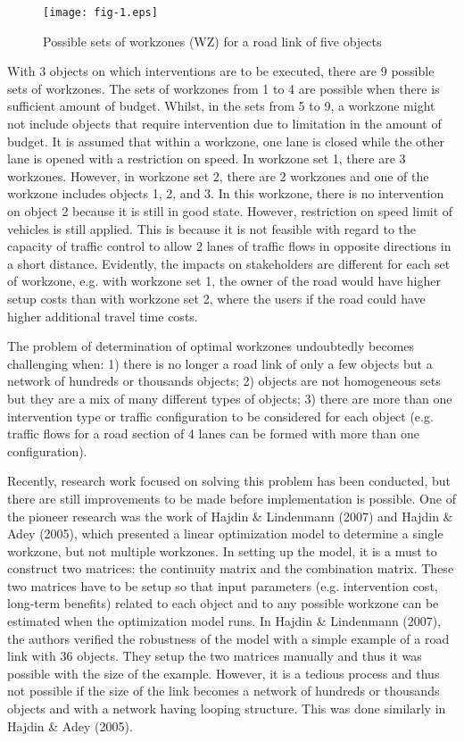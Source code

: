 \documentclass[10pt]{article}
\begin{document}
\begin{figure}[h]
\begin{center}
\texttt{[image: fig-1.eps]}
\caption{Possible sets of workzones (WZ) for a road link of five
objects}\label{fig:1}
\end{center}
\end{figure}

With 3 objects on which interventions are to be executed, there are 9 possible
sets of workzones. The sets of workzones from 1 to 4 are possible when there is
sufficient amount of budget. Whilst, in the sets from 5 to 9, a workzone might
not include objects that require intervention due to limitation in the amount of
budget. It is assumed that within a workzone, one lane is closed while the other
lane is opened with a restriction on speed. In workzone set 1, there are 3
workzones. However, in workzone set 2, there are 2 workzones and one of the
workzone includes objects 1, 2, and 3. In this workzone, there is no intervention
on object 2 because it is still in good state. However, restriction on speed
limit of vehicles is still applied. This is because it is not feasible with
regard to the capacity of traffic control to allow 2 lanes of traffic flows in
opposite directions in a short distance. Evidently, the impacts on stakeholders
are different for each set of workzone, e.g. with workzone set 1, the owner of
the road would have higher setup costs than with workzone set 2, where the users
if the road could have higher additional travel time costs.

The problem of determination of optimal workzones undoubtedly becomes
challenging when: 1) there is no longer a road link of only a few objects but a
network of hundreds or thousands objects; 2) objects are not homogeneous sets but
they are a mix of many different types of objects; 3) there are more than one
intervention type or traffic configuration to be considered for each object (e.g.
traffic flows for a road section of 4 lanes can be formed with more than one
configuration).

Recently, research work focused on solving this problem has been conducted, but
there are still improvements to be made before implementation is possible. One of
the pioneer research was the work of Hajdin \& Lindenmann (2007) and Hajdin \&
Adey (2005), which presented a linear optimization model to determine a single
workzone, but not multiple workzones. In setting up the model, it is a must to
construct two matrices: the continuity matrix and the combination matrix. These
two matrices have to be setup so that input parameters (e.g. intervention cost,
long-term benefits) related to each object and to any possible workzone can be
estimated when the optimization model runs. In Hajdin \& Lindenmann (2007), the
authors verified the robustness of the model with a simple example of a road link
with 36 objects. They setup the two matrices manually and thus it was possible
with the size of the example. However, it is a tedious process and thus not
possible if the size of the link becomes a network of hundreds or thousands
objects and with a network having looping structure. This was done similarly in
Hajdin \& Adey (2005).
\end{document}

